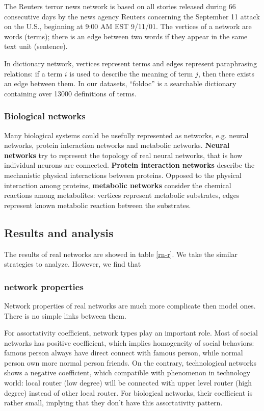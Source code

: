 \documentclass[symmetry,article,submit,moreauthors,pdftex,10pt,a4paper]{Definitions/mdpi}
\begin{document}
\begin{description}[leftmargin=0cm]
\item [terror news network] The Reuters terror news network is based on all stories released during 66 consecutive days by the news agency Reuters concerning the September 11 attack on the U.S., beginning at 9:00 AM EST 9/11/01. The vertices of a network are words (terms); there is an edge between two words if they appear in the same text unit (sentence).
\item [dictionary network] In dictionary network, vertices represent terms and edges represent paraphrasing relations: if a term $i$ is used to describe the meaning of term $j$, then there exists an edge between them. In our datasets, ``foldoc'' is a searchable dictionary containing over 13000 definitions of terms.
\end{description}

\subsubsection{Biological networks}
Many biological systems could be usefully represented as networks, e.g. neural networks, protein interaction networks and metabolic networks. \textbf{Neural networks} try to represent the topology of real neural networks, that is how individual neurons are connected. \textbf{Protein interaction networks} describe the mechanistic physical interactions between proteins. Opposed to the physical interaction among proteins, \textbf{metabolic networks} consider the chemical reactions among metabolites: vertices represent metabolic substrates, edges represent known metabolic reaction between the substrates.

\subsection{Results and analysis}
The results of real networks are showed in table \ref{rn-r}. We take the similar strategies to analyze. However, we find that


\subsubsection{network properties}
Network properties of real networks are much more complicate then model ones. There is no simple links between them. 

For assortativity coefficient, network types play an important role. Most of social networks has positive coefficient, which implies homogeneity of social behaviors: famous person always have direct connect with famous person, while normal person own more normal person friends. On the contrary, technological networks shows a negative coefficient, which compatible with phenomenon in technology world: local router (low degree)  will be connected with upper level router (high degree) instead of other local router. For biological networks, their coefficient is rather small,  implying that they don't have this assortativity pattern.
\end{document}
